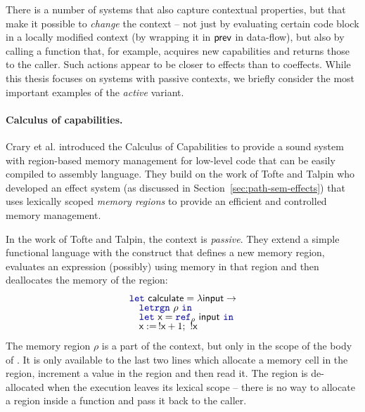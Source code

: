 There is a number of systems that also capture contextual properties, but that make it possible to 
\emph{change} the context -- not just by evaluating certain code block in a locally modified context
(\eg by wrapping it in $\textnormal{\sffamily prev}$ in data-flow), but also by calling a function that, for example, 
acquires new capabilities and returns those to the caller. Such actions appear to be closer to 
effects than to coeffects. While this thesis focuses on systems with passive contexts, we briefly 
consider the most important examples of the \emph{active} variant.


\paragraph{Calculus of capabilities.}
\label{sec:applications-active-ccc}

Crary et al. \cite{app-capabilities} introduced the Calculus of Capabilities to provide 
a sound system with region-based memory management for low-level code that can be easily 
compiled to assembly language. They build on the work of Tofte and Talpin \cite{app-region-memory}
who developed an effect system (as discussed in Section~\ref{sec:path-sem-effects}) that uses
lexically scoped \emph{memory regions} to provide an efficient and controlled memory management.

In the work of Tofte and Talpin, the context is \emph{passive}. They extend a simple functional language
with the  construct that defines a new memory region, evaluates an expression (possibly)
using memory in that region and then deallocates the memory of the region:
%
\begin{equation*}
\begin{array}{l}
\kvd{let}~\ident{calculate} = \lambda \ident{input} \rightarrow\\[-0.25em]
\quad \kvd{letrgn}~\rho~\kvd{in}\\[-0.25em]
\quad \kvd{let}~\ident{x} = \kvd{ref}_\rho ~\ident{input}~\kvd{in}\\[-0.25em]
\quad \ident{x} :=\, !\ident{x} + 1;~ !\ident{x}
\end{array}
\end{equation*}
%
The memory region $\rho$ is a part of the context, but only in the scope of the body of 
. It is only available to the last two lines which allocate a memory cell in the region,
increment a value in the region and then read it. The region is de-allocated when the execution 
leaves its lexical scope -- there is no way to allocate a region inside a function and pass it back 
to the caller.

